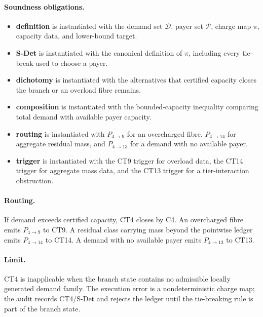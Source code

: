 \documentclass[
  11pt,
]{article}
\providecommand{\tightlist}{%
  \setlength{\itemsep}{0pt}\setlength{\parskip}{0pt}}
\theoremstyle{definition}
\newcommand{\ctpar}[1]{\paragraph{#1.}}
\begin{document}
\ctpar{Soundness obligations}
\begin{itemize}
\tightlist
\item \textbf{definition} is instantiated with the demand set \(\mathcal D\), payer set \(\mathcal P\), charge map \(\pi\), capacity data, and lower-bound target.
\item \textbf{S-Det} is instantiated with the canonical definition of \(\pi\), including every tie-break used to choose a payer.
\item \textbf{dichotomy} is instantiated with the alternatives that certified capacity closes the branch or an overload fibre remains.
\item \textbf{composition} is instantiated with the bounded-capacity inequality comparing total demand with available payer capacity.
\item \textbf{routing} is instantiated with \(P_{4\to9}\) for an overcharged fibre, \(P_{4\to14}\) for aggregate residual mass, and \(P_{4\to13}\) for a demand with no available payer.
\item \textbf{trigger} is instantiated with the CT9 trigger for overload data, the CT14 trigger for aggregate mass data, and the CT13 trigger for a tier-interaction obstruction.
\end{itemize}

\ctpar{Routing}
If demand exceeds certified capacity, CT4 closes by C4.  An overcharged
fibre emits \(P_{4\to9}\) to CT9.  A residual class carrying mass beyond
the pointwise ledger emits \(P_{4\to14}\) to CT14.  A demand with no
available payer emits \(P_{4\to13}\) to CT13.

\ctpar{Limit}
CT4 is inapplicable when the branch state contains no admissible locally
generated demand family. The
execution error is a nondeterministic charge map; the audit records
CT4/S-Det and rejects the ledger until the tie-breaking rule is part of
the branch state.
\end{document}

